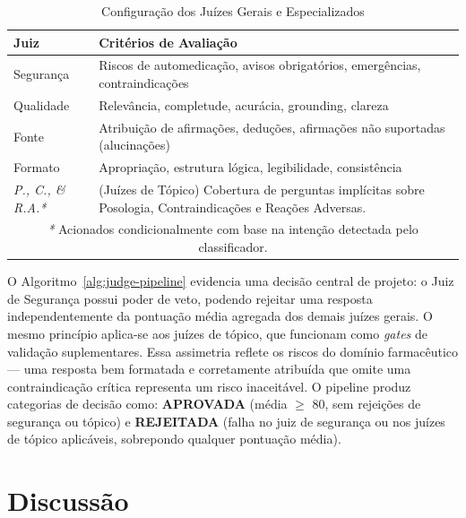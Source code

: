 \documentclass[12pt]{article}
\begin{document}
\begin{table}[h]
\centering
\caption{Configuração dos Juízes Gerais e Especializados}
\label{tab:judge-weights}
\begin{tabular}{|l|p{9cm}|}
\hline
\textbf{Juiz} & \textbf{Critérios de Avaliação} \\
\hline
Segurança & Riscos de automedicação, avisos obrigatórios, emergências, contraindicações \\
\hline
Qualidade & Relevância, completude, acurácia, grounding, clareza \\
\hline
Fonte & Atribuição de afirmações, deduções, afirmações não suportadas (alucinações) \\
\hline
Formato & Apropriação, estrutura lógica, legibilidade, consistência \\
\hline
\textit{P., C., \& R.A.*} & (Juízes de Tópico) Cobertura de perguntas implícitas sobre Posologia, Contraindicações e Reações Adversas. \\
\hline
\multicolumn{2}{|c|}{\footnotesize \textit{*} Acionados condicionalmente com base na intenção detectada pelo classificador.} \\
\hline
\end{tabular}
\end{table}

O Algoritmo~\ref{alg:judge-pipeline} evidencia uma decisão central de projeto: o Juiz de Segurança possui poder de veto, podendo rejeitar uma resposta independentemente da pontuação média agregada dos demais juízes gerais. O mesmo princípio aplica-se aos juízes de tópico, que funcionam como \textit{gates} de validação suplementares. Essa assimetria reflete os riscos do domínio farmacêutico --- uma resposta bem formatada e corretamente atribuída que omite uma contraindicação crítica representa um risco inaceitável. O pipeline produz categorias de decisão como: \textbf{APROVADA} (média $\geq$ 80, sem rejeições de segurança ou tópico) e \textbf{REJEITADA} (falha no juiz de segurança ou nos juízes de tópico aplicáveis, sobrepondo qualquer pontuação média).

\FloatBarrier


\section{Discussão}
\label{sec:discussao}
\end{document}
